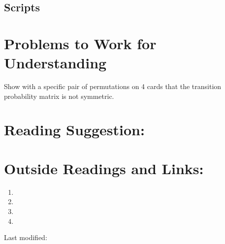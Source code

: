 \documentclass[12pt]{article}
\begin{document}
\subsection*{Scripts}

% 

\hr

\section*{Problems to Work for Understanding}
\begin{exercise}
  Show with a specific pair of permutations on 4 cards that the
  transition probability matrix is not symmetric.
\end{exercise}
\begin{solution}
  
\end{solution}


\hr

\section*{Reading Suggestion:}




\hr

\section*{Outside Readings and Links:}
\begin{enumerate}
    \item
    \item
    \item
    \item
\end{enumerate}

\hr

\mydisclaim \myfooter

Last modified:  \flastmod
\end{document}
